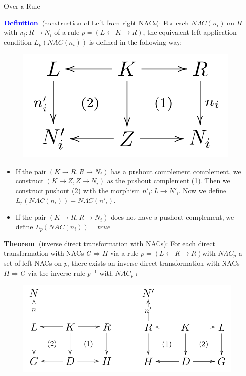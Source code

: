 \documentclass[xcolor=dvipsnames,pdf,10pt]{beamer}
\newcommand{\defn}{\textcolor{blue}{\textbf{\textrm{Definition\ }}}}
\newcommand{\thm}{\textcolor{OliveGreen}{\textbf{\textrm{Theorem\ }}}}
\newcommand{\grule}{$p = (L \leftarrow K \rightarrow R) $}
\begin{document}
\begin{frame}[allowframebreaks]{Over a Rule}

\defn (construction of Left from right NACs): For each $NAC(n_i)$ on $R$ with $n_i : R \rightarrow N_i$ of a rule $p = (L \leftarrow K \rightarrow R)$, the equivalent left application condition $L_p(NAC(n_i))$ is defined in the following way:

\begin{figure}[htbp]
\centering
\includegraphics[width=.4\textwidth]{fig/nac-left-from-right.png}
\label{fig:nac-left-from-right}
\end{figure}

\begin{itemize}
\item If the pair $(K \rightarrow R, R \rightarrow N_i)$ has a pushout complement complement, we construct $(K \rightarrow Z, Z \rightarrow N_i)$ as the pushout complement (1). Then we construct pushout (2) with the morphism $n'_i : L \rightarrow N'_i$. Now we define $L_p(NAC(n_i)) = NAC(n'_i)$.
\item If the pair $(K \rightarrow R, R \rightarrow N_i)$ does not have a pushout complement, we define $L_p(NAC(n_i)) = true$
\end{itemize}

\thm (inverse direct transformation with NACs): For each direct transformation with NACs $G \Rightarrow H$ via a rule \grule with $NAC_p$ a set of left NACs on $p$, there exists an inverse direct transformation with NACs $H \Rightarrow G$ via the inverse rule $p^{-1}$ with $NAC_{p^{-1}}$ 

\begin{figure}[htbp]
\centering
\includegraphics[width=.8\textwidth]{fig/inverse-direct-transformation-with-nacs.png}
\label{fig:inverse-direct-transformation-with-nacs}
\end{figure}


\end{frame}
\end{document}

